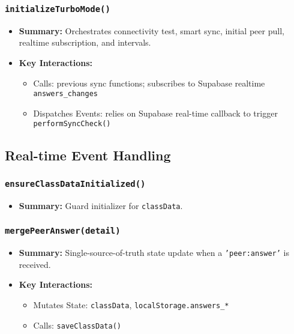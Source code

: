 \documentclass[11pt,letterpaper]{article}
\begin{document}
\subsubsection{\texttt{initializeTurboMode()}}
\begin{itemize}
    \item \textbf{Summary:} Orchestrates connectivity test, smart sync, initial peer pull, realtime subscription, and intervals.
    \item \textbf{Key Interactions:}
    \begin{itemize}
        \item Calls: previous sync functions; subscribes to Supabase realtime \texttt{answers\_changes}
        \item Dispatches Events: relies on Supabase real-time callback to trigger \texttt{performSyncCheck()}
    \end{itemize}
\end{itemize}

\subsection{Real-time Event Handling}

\subsubsection{\texttt{ensureClassDataInitialized()}}
\begin{itemize}
    \item \textbf{Summary:} Guard initializer for \texttt{classData}.
\end{itemize}

\subsubsection{\texttt{mergePeerAnswer(detail)}}
\begin{itemize}
    \item \textbf{Summary:} Single-source-of-truth state update when a \texttt{'peer:answer'} is received.
    \item \textbf{Key Interactions:}
    \begin{itemize}
        \item Mutates State: \texttt{classData}, \texttt{localStorage.answers\_*}
        \item Calls: \texttt{saveClassData()}
    \end{itemize}
\end{itemize}
\end{document}
